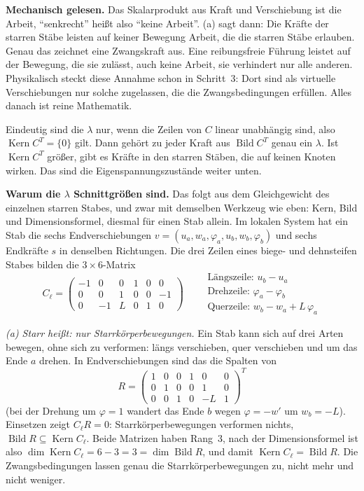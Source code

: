 \textbf{Mechanisch gelesen.} Das Skalarprodukt aus Kraft und Verschiebung ist die Arbeit,
\enquote{senkrecht} heißt also \enquote{keine Arbeit}. (a) sagt dann: Die Kräfte der starren Stäbe
leisten auf keiner Bewegung Arbeit, die die starren Stäbe erlauben. Genau das zeichnet eine
Zwangskraft aus. Eine reibungsfreie Führung leistet auf der Bewegung, die sie zulässt, auch keine
Arbeit, sie verhindert nur alle anderen. Physikalisch steckt diese Annahme schon in Schritt~3: Dort
sind als virtuelle Verschiebungen nur solche zugelassen, die die Zwangsbedingungen erfüllen. Alles
danach ist reine Mathematik.

Eindeutig sind die $\lambda$ nur, wenn die Zeilen von $C$ linear unabhängig sind, also
$\operatorname{Kern} C^T = \{0\}$ gilt. Dann gehört zu jeder Kraft aus $\operatorname{Bild} C^T$
genau ein $\lambda$. Ist $\operatorname{Kern} C^T$ größer, gibt es Kräfte in den starren Stäben,
die auf keinen Knoten wirken. Das sind die Eigenspannungszustände weiter unten.

\textbf{Warum die $\lambda$ Schnittgrößen sind.} Das folgt aus dem Gleichgewicht des einzelnen
starren Stabes, und zwar mit demselben Werkzeug wie eben: Kern, Bild und Dimensionsformel, diesmal
für einen Stab allein. Im lokalen System hat ein Stab die sechs Endverschiebungen
$v = (u_a, w_a, \varphi_a, u_b, w_b, \varphi_b)$ und sechs Endkräfte $s$ in denselben Richtungen.
Die drei Zeilen eines biege- und dehnsteifen Stabes bilden die $3 \times 6$-Matrix
\[
  C_\ell = \begin{pmatrix} -1 & 0 & 0 & 1 & 0 & 0 \\ 0 & 0 & 1 & 0 & 0 & -1 \\ 0 & -1 & L & 0 & 1 & 0 \end{pmatrix}
  \qquad
  \begin{matrix} \text{Längszeile: } u_b - u_a \\ \text{Drehzeile: } \varphi_a - \varphi_b \\
                 \text{Querzeile: } w_b - w_a + L\,\varphi_a \end{matrix}
\]

\emph{(a) Starr heißt: nur Starrkörperbewegungen.} Ein Stab kann sich auf drei Arten bewegen, ohne
sich zu verformen: längs verschieben, quer verschieben und um das Ende $a$ drehen. In
Endverschiebungen sind das die Spalten von
\[
  R = \begin{pmatrix} 1 & 0 & 0 & 1 & 0 & 0 \\ 0 & 1 & 0 & 0 & 1 & 0 \\ 0 & 0 & 1 & 0 & -L & 1 \end{pmatrix}^T
\]
(bei der Drehung um $\varphi = 1$ wandert das Ende $b$ wegen $\varphi = -w'$ um $w_b = -L$).
Einsetzen zeigt $C_\ell R = 0$: Starrkörperbewegungen verformen nichts, $\operatorname{Bild} R
\subseteq \operatorname{Kern} C_\ell$. Beide Matrizen haben Rang~$3$, nach der Dimensionsformel ist
also $\dim \operatorname{Kern} C_\ell = 6 - 3 = 3 = \dim \operatorname{Bild} R$, und damit
$\operatorname{Kern} C_\ell = \operatorname{Bild} R$. Die Zwangsbedingungen lassen genau die
Starrkörperbewegungen zu, nicht mehr und nicht weniger.

